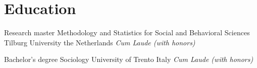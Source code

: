 \section{Education}
            {Research master}
            {Methodology and Statistics for Social and Behavioral Sciences}
            {Tilburg University}
            {the Netherlands}
            {\emph{Cum Laude (with honors)}}
            {} 
    
    \vspace{10pt}
    
            {Bachelor's degree}
            {Sociology}
            {University of Trento}
            {Italy}
            {\emph{Cum Laude (with honors)}}
            {}